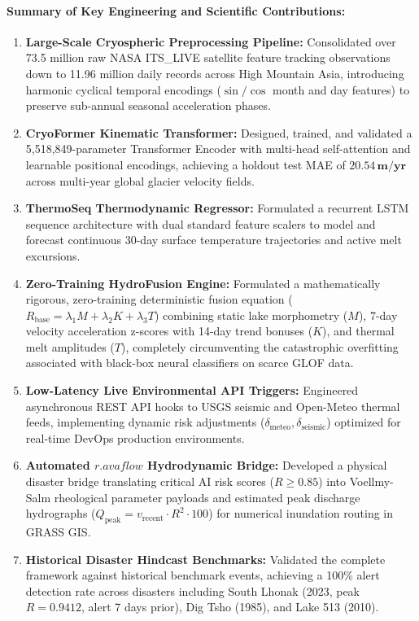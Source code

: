 \documentclass{mnnit}
\begin{document}
\paragraph{Summary of Key Engineering and Scientific Contributions:}
\begin{enumerate}
    \item \textbf{Large-Scale Cryospheric Preprocessing Pipeline:} Consolidated over 73.5 million raw NASA ITS\_LIVE satellite feature tracking observations down to 11.96 million daily records across High Mountain Asia, introducing harmonic cyclical temporal encodings ($\sin/\cos$ month and day features) to preserve sub-annual seasonal acceleration phases.
    \item \textbf{CryoFormer Kinematic Transformer:} Designed, trained, and validated a 5,518,849-parameter Transformer Encoder with multi-head self-attention and learnable positional encodings, achieving a holdout test MAE of $\mathbf{20.54\,\text{m/yr}}$ across multi-year global glacier velocity fields.
    \item \textbf{ThermoSeq Thermodynamic Regressor:} Formulated a recurrent LSTM sequence architecture with dual standard feature scalers to model and forecast continuous 30-day surface temperature trajectories and active melt excursions.
    \item \textbf{Zero-Training HydroFusion Engine:} Formulated a mathematically rigorous, zero-training deterministic fusion equation ($R_{\text{base}} = \lambda_1 M + \lambda_2 K + \lambda_3 T$) combining static lake morphometry ($M$), 7-day velocity acceleration z-scores with 14-day trend bonuses ($K$), and thermal melt amplitudes ($T$), completely circumventing the catastrophic overfitting associated with black-box neural classifiers on scarce GLOF data.
    \item \textbf{Low-Latency Live Environmental API Triggers:} Engineered asynchronous REST API hooks to USGS seismic and Open-Meteo thermal feeds, implementing dynamic risk adjustments ($\delta_{\text{meteo}}, \delta_{\text{seismic}}$) optimized for real-time DevOps production environments.
    \item \textbf{Automated $r.avaflow$ Hydrodynamic Bridge:} Developed a physical disaster bridge translating critical AI risk scores ($R \ge 0.85$) into Voellmy-Salm rheological parameter payloads and estimated peak discharge hydrographs ($Q_{\text{peak}} = v_{\text{recent}} \cdot R^2 \cdot 100$) for numerical inundation routing in GRASS GIS.
    \item \textbf{Historical Disaster Hindcast Benchmarks:} Validated the complete framework against historical benchmark events, achieving a 100\% alert detection rate across disasters including South Lhonak (2023, peak $R = 0.9412$, alert 7 days prior), Dig Tsho (1985), and Lake 513 (2010).
\end{enumerate}
\end{document}

